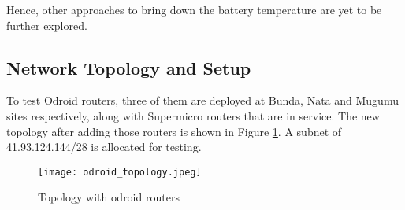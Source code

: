 Hence, other approaches to bring down the battery temperature are yet to be further explored.

\subsection{Network Topology and Setup}
To test Odroid routers, three of them are deployed at Bunda, Nata and Mugumu sites respectively, along with Supermicro routers that are in service. The new topology after adding those routers is shown in Figure \ref{odroid_topology}. A subnet of 41.93.124.144/28 is allocated for testing.

\begin{figure}[h]
\centering
\texttt{[image: odroid\_topology.jpeg]}
\caption{Topology with odroid routers}
\label{odroid_topology}
\end{figure}

